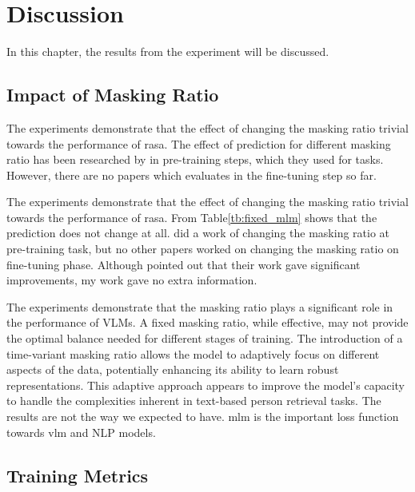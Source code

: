 
\chapter{Discussion}
In this chapter, the results from the experiment will be discussed.

\section{Impact of Masking Ratio}

The experiments demonstrate that the effect of changing the masking ratio trivial towards the performance of \acrshort{rasa}. 
The effect of prediction for different masking ratio has been researched by \cite{yang2023learningbettermaskingbetter} in pre-training steps, which they used for  tasks. However, there are no papers which evaluates in the fine-tuning step so far.


The experiments demonstrate that the effect of changing the masking ratio trivial towards the performance of \acrshort{rasa}. From Table\ref{tb:fixed_mlm} shows that the prediction does not change at all. \cite{yang2023learningbettermaskingbetter} did a work of changing the masking ratio at pre-training task, but no other papers worked on changing the masking ratio on fine-tuning phase. 
Although \cite{yang2023learningbettermaskingbetter} pointed out that their work gave significant improvements, my work gave no extra information. 

The experiments demonstrate that the masking ratio plays a significant role in the performance of VLMs. A fixed masking ratio, while effective, may not provide the optimal balance needed for different stages of training. The introduction of a time-variant masking ratio allows the model to adaptively focus on different aspects of the data, potentially enhancing its ability to learn robust representations. This adaptive approach appears to improve the model's capacity to handle the complexities inherent in text-based person retrieval tasks.
The results are not the way we expected to have. \acrshort{mlm} is the important loss function towards \acrshort{vlm} and NLP models. 


\section{Training Metrics}

